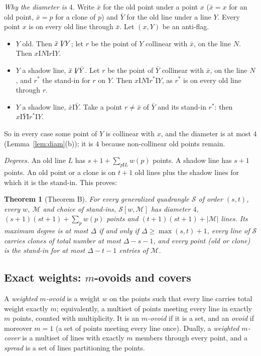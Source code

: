 \documentclass[11pt]{amsart}
\newtheorem{theorem}{Theorem}[section]
\theoremstyle{definition}
\theoremstyle{remark}
\newcommand{\I}{\mathrel{\mathrm{I}}}
\newcommand{\nI}{\mathrel{\not\mathrel{\mathrm{I}}}}
\newcommand{\cS}{\mathcal{S}}
\newcommand{\cM}{\mathcal{M}}
\begin{document}
\emph{Why the diameter is $4$.} Write $\bar x$ for the old point under a point $x$ ($\bar x=x$ for an old point, $\bar x=p$ for a clone of $p$) and $\bar Y$ for the old line under a line $Y$. Every point $x$ is on every old line through $\bar x$. Let $(x,Y)$ be an anti-flag.
\begin{itemize}[leftmargin=1.5em]
\item $Y$ old. Then $\bar x\nI Y$; let $r$ be the point of $Y$ collinear with $\bar x$, on the line $N$. Then $x\I N\I r\I Y$.
\item $Y$ a shadow line, $\bar x\nI\bar Y$. Let $r$ be the point of $\bar Y$ collinear with $\bar x$, on the line $N$, and $r^*$ the stand-in for $r$ on $Y$. Then $x\I N\I r^*\I Y$, as $r^*$ is on every old line through $r$.
\item $Y$ a shadow line, $\bar x\I\bar Y$. Take a point $r\ne\bar x$ of $\bar Y$ and its stand-in $r^*$: then $x\I\bar Y\I r^*\I Y$.
\end{itemize}
So in every case some point of $Y$ is collinear with $x$, and the diameter is at most $4$ (Lemma~\ref{lem:diam}(b)); it is $4$ because non-collinear old points remain.

\emph{Degrees.} An old line $L$ has $s+1+\sum_{p\I L}w(p)$ points. A shadow line has $s+1$ points. An old point or a clone is on $t+1$ old lines plus the shadow lines for which it is the stand-in. This proves:

\begin{theorem}[Theorem B]\label{thm:B}
For every generalized quadrangle $\cS$ of order $(s,t)$, every $w$, $\cM$ and choice of stand-ins, $\cS[w,\cM]$ has diameter $4$, $(s+1)(st+1)+\sum_pw(p)$ points and $(t+1)(st+1)+|\cM|$ lines. Its maximum degree is at most $\Delta$ if and only if $\Delta\ge\max(s,t)+1$, every line of $\cS$ carries clones of total number at most $\Delta-s-1$, and every point \textup{(}old or clone\textup{)} is the stand-in for at most $\Delta-t-1$ entries of $\cM$.
\end{theorem}

\subsection{Exact weights: \texorpdfstring{$m$}{m}-ovoids and covers}\label{ssec:weights}
A \emph{weighted $m$-ovoid} is a weight $w$ on the points such that every line carries total weight exactly $m$; equivalently, a multiset of points meeting every line in exactly $m$ points, counted with multiplicity. It is an \emph{$m$-ovoid} if it is a set, and an \emph{ovoid} if moreover $m=1$ (a set of points meeting every line once). Dually, a \emph{weighted $m$-cover} is a multiset of lines with exactly $m$ members through every point, and a \emph{spread} is a set of lines partitioning the points.
\end{document}
